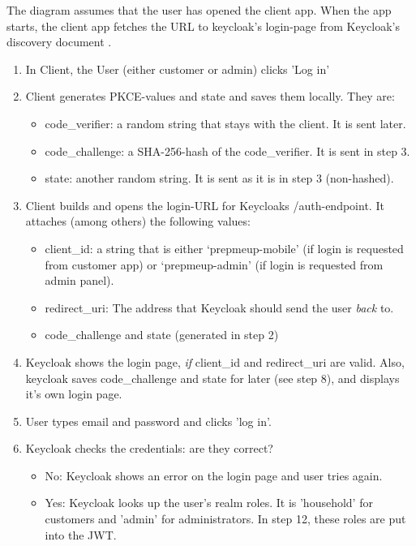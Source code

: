 \documentclass[a4paper,11pt]{article}
\begin{document}
The diagram assumes that the user has opened the client app.
When the app starts, the client app fetches the URL to keycloak's login-page from Keycloak's discovery document \cite{openid-connect-discovery}.
\begin{enumerate}
    \item In Client, the User (either customer or admin) clicks 'Log in'
    \item Client generates PKCE-values and state and saves them locally. They are:
        \begin{itemize}
            \item code\_verifier: a random string that stays with the client. It is sent later.
            \item code\_challenge: a SHA-256-hash of the code\_verifier. It is sent in step 3.
            \item state: another random string. It is sent as it is in step 3 (non-hashed).
        \end{itemize}
    \item Client builds and opens the login-URL for Keycloaks /auth-endpoint. It attaches (among others) the following values:
        \begin{itemize}
            \item client\_id: a string that is either `prepmeup-mobile' (if login is requested from customer app) or `prepmeup-admin' (if login is requested from admin panel).
            \item redirect\_uri: The address that Keycloak should send the user \textit{back} to.
            \item code\_challenge and state (generated in step 2)
        \end{itemize}
    \item Keycloak shows the login page, \textit{if} client\_id and redirect\_uri are valid. Also, keycloak saves code\_challenge and state for later (see step 8), and displays it's own login page.
    \item User types email and password and clicks 'log in'.
    \item Keycloak checks the credentials: are they correct?
        \begin{itemize}
            \item No: Keycloak shows an error on the login page and user tries again.
            \item Yes: Keycloak looks up the user's realm roles. It is 'household' for customers and 'admin' for administrators. In step 12, these roles are put into the JWT.

\end{itemize}
\end{enumerate}
\end{document}
